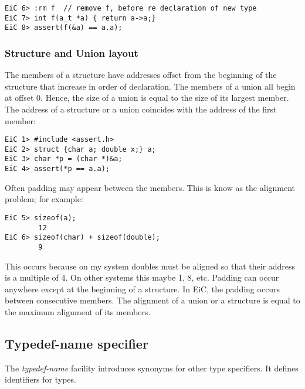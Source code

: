 \begin{production}
\begin{verbatim}
EiC 6> :rm f  // remove f, before re declaration of new type
EiC 7> int f(a_t *a) { return a->a;} 
EiC 8> assert(f(&a) == a.a);
\end{verbatim}
\end{production}

\subsubsection{Structure and Union layout}
\label{StructureUnionLayout}

The members of a structure have addresses offset from the beginning of
the structure that increase in order of declaration. The members of a
union all begin at offset 0. Hence, the size of a union is equal to
the size of its largest member. The address of a structure or a union
coincides with the address of the first member:
\begin{production}
\begin{verbatim}
EiC 1> #include <assert.h>
EiC 2> struct {char a; double x;} a; 
EiC 3> char *p = (char *)&a;
EiC 4> assert(*p == a.a);
\end{verbatim}
\end{production}

Often padding may appear between the members. This is know as the
alignment problem; for example:

\begin{production}
\begin{verbatim}
EiC 5> sizeof(a);
        12
EiC 6> sizeof(char) + sizeof(double);
        9
\end{verbatim}
\end{production}

This occurs because on my system doubles must be aligned so that
their address is a multiple of 4. On other systems this maybe 1, 8,
etc.  Padding can occur anywhere except at the beginning of a
structure.  In EiC, the padding occurs between consecutive members.
The alignment of a union or a structure is equal to the maximum
alignment of its members.

\subsection{Typedef-name specifier}
\label{sec:TypedefName}
The {\it typedef-name} facility introduces synonyms for other type specifiers. It
defines identifiers for types.

